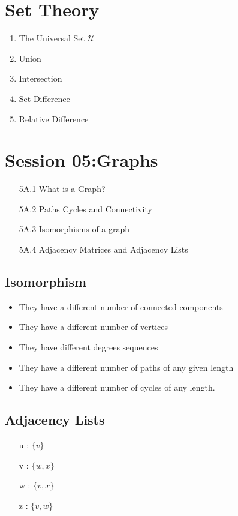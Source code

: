 \documentclass{article}
\begin{document}
\section{Set Theory}
\begin{enumerate}
\item The Universal Set $\mathcal{U}$
\item Union
\item Intersection
\item Set Difference
\item Relative Difference
\end{enumerate}

\newpage




\section*{Session 05:Graphs}
\begin{itemize}
\item[5A.1] What is a Graph?
\item[5A.2] Paths Cycles and Connectivity
\item[5A.3] Isomorphisms of a graph
\item[5A.4] Adjacency Matrices and Adjacency Lists
\end{itemize}


\subsection*{Isomorphism}
\begin{itemize}
\item They have a different number of connected components
\item They have a different number of vertices
\item They have different degrees sequences
\item They have a different number of paths of any given length
\item They have a different number of cycles of any length.
\end{itemize}

\subsection*{Adjacency Lists}
\begin{itemize}
\item[u]: $\{v\}$
\item[v]: $\{w,x\}$
\item[w]: $\{v,x\}$
\item[z]: $\{v,w\}$
\end{itemize}
\end{document}
